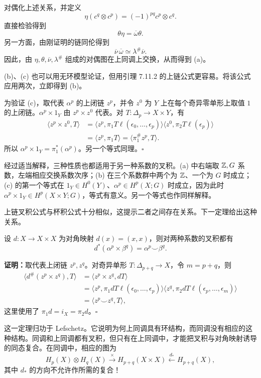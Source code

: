 对偶化上述关系，并定义
\[
\eta(c^q\otimes c^p)=(-1)^{pq}c^p\otimes c^q.
\]
直接检验得到
\[\theta\eta=\overline\omega\theta.\]
另一方面，由刚证明的链同伦得到
\[\overline\nu\,\overline\omega\simeq\lambda^\#\overline\nu.\]
因此，由 $\eta,\theta,\overline\nu,\lambda^\#$ 组成的对偶图在上同调上交换，从而得到 (a)。

(b)、(c) 也可以用无环模型论证，但用引理 7.11.2 的上链公式更容易。将该公式应用两次，立即得到 (b)。

为验证 (c)，取代表 $\alpha^p$ 的上闭链 $z^p$，并令 $z^0$ 为 $Y$ 上在每个奇异零单形上取值 $1$ 的上闭链。$\alpha^p\times1_Y$ 由 $z^p\times z^0$ 代表。对 $T:\Delta_p\to X\times Y$，有
\begin{align*}
\langle z^p\times z^0,T\rangle
&=\langle z^p,\pi_1T\ell(\epsilon_0,\ldots,\epsilon_p)\rangle
\langle z^0,\pi_2T\ell(\epsilon_p)\rangle\\
&=\langle z^p,\pi_1T\rangle=\langle\pi_1^\#z^p,T\rangle.
\end{align*}
所以 $\alpha^p\times1_Y=\pi_1^*(\alpha^p)$。另一个等式同理。\hfill$\square$

经过适当解释，三种性质也都适用于另一种系数的叉积。(a) 中右端取 $\mathbb{Z},G$ 系数，左端相应交换系数次序；(b) 在三个系数群中两个为 $\mathbb{Z}$、一个为 $G$ 时成立；(c) 的第一个等式在 $1_Y\in H^0(Y)$、$\alpha^p\in H^p(X;G)$ 时成立，因为此时 $\alpha^p\times1_Y\in H^p(X\times Y;G)$，等式有意义。另一个等式也作同样解释。

上链叉积公式与杯积公式十分相似，这提示二者之间存在关系。下一定理给出这种关系。

设 $d:X\to X\times X$ 为对角映射 $d(x)=(x,x)$，则对两种系数的叉积都有
\[d^*(\alpha^p\times\beta^q)=\alpha^p\smile\beta^q.\]

\textbf{证明：}取代表上闭链 $z^p,z^q$。对奇异单形 $T:\Delta_{p+q}\to X$，令 $m=p+q$，则
\begin{align*}
\langle d^\#(z^p\times z^q),T\rangle
&=\langle z^p\times z^q,dT\rangle\\
&=\langle z^p,\pi_1dT\ell(\epsilon_0,\ldots,\epsilon_p)\rangle
\langle z^q,\pi_2dT\ell(\epsilon_p,\ldots,\epsilon_m)\rangle\\
&=\langle z^p\smile z^q,T\rangle,
\end{align*}
这里使用了 $\pi_1d=i_X=\pi_2d$。\hfill$\square$

这一定理归功于 Lefschetz。它说明为何上同调具有环结构，而同调没有相应的这种结构。同调和上同调都有叉积，但只有在上同调中，才能把叉积与对角映射诱导的同态复合。在同调中，相应的图为
\[
H_p(X)\otimes H_q(X)\xrightarrow{\times}H_{p+q}(X\times X)
\xleftarrow{d_*}H_{p+q}(X),
\]
其中 $d_*$ 的方向不允许作所需的复合！


